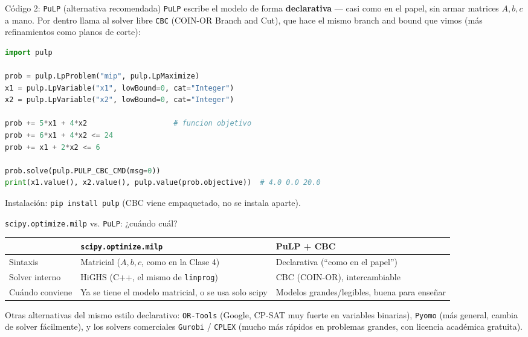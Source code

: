 \documentclass[aspectratio=169]{beamer}
\begin{document}
\begin{frame}[fragile]{Código 2: \texttt{PuLP} (alternativa recomendada)}
\texttt{PuLP} escribe el modelo de forma \textbf{declarativa} --- casi como en el papel, sin armar matrices $A,b,c$ a mano. Por dentro llama al solver libre \texttt{CBC} (COIN-OR Branch and Cut), que hace el mismo branch and bound que vimos (más refinamientos como planos de corte):

\begin{lstlisting}[language=Python]
import pulp

prob = pulp.LpProblem("mip", pulp.LpMaximize)
x1 = pulp.LpVariable("x1", lowBound=0, cat="Integer")
x2 = pulp.LpVariable("x2", lowBound=0, cat="Integer")

prob += 5*x1 + 4*x2                    # funcion objetivo
prob += 6*x1 + 4*x2 <= 24
prob += x1 + 2*x2 <= 6

prob.solve(pulp.PULP_CBC_CMD(msg=0))
print(x1.value(), x2.value(), pulp.value(prob.objective))  # 4.0 0.0 20.0
\end{lstlisting}

Instalación: \texttt{pip install pulp} (CBC viene empaquetado, no se instala aparte).
\end{frame}

\begin{frame}{\texttt{scipy.optimize.milp} vs. \texttt{PuLP}: ¿cuándo cuál?}
\small
\begin{center}
\renewcommand{\arraystretch}{1.15}
\begin{tabular}{@{}p{2.6cm}p{4.3cm}p{4.3cm}@{}}
\toprule
& \textbf{\texttt{scipy.optimize.milp}} & \textbf{PuLP + CBC}\\
\midrule
Sintaxis & Matricial ($A,b,c$, como en la Clase 4) & Declarativa (``como en el papel'')\\
Solver interno & HiGHS (C++, el mismo de \texttt{linprog}) & CBC (COIN-OR), intercambiable\\
Cuándo conviene & Ya se tiene el modelo matricial, o se usa solo scipy & Modelos grandes/legibles, buena para enseñar\\
\bottomrule
\end{tabular}
\end{center}
\normalsize

\vspace{0.1cm}
\small Otras alternativas del mismo estilo declarativo: \texttt{OR-Tools} (Google, CP-SAT muy fuerte en variables binarias), \texttt{Pyomo} (más general, cambia de solver fácilmente), y los solvers comerciales \texttt{Gurobi} / \texttt{CPLEX} (mucho más rápidos en problemas grandes, con licencia académica gratuita).
\end{frame}
\end{document}
